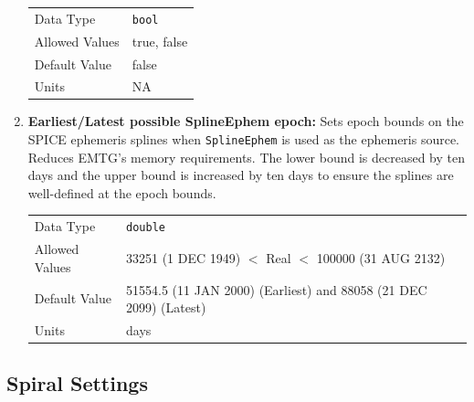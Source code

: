 \begin{enumerate}
            \begin{table}[H]
                \hspace{2cm}
                \begin{tabular}{ll}
                Data Type & \verb|bool| \\
                Allowed Values & true, false \\
                Default Value & false \\
                Units & NA
                \end{tabular}
            \end{table}

        \item \textbf{Earliest/Latest possible SplineEphem epoch:} Sets epoch bounds on the \ac{SPICE} ephemeris splines when \verb|SplineEphem| is used as the ephemeris source. Reduces \ac{EMTG}'s memory requirements. The lower bound is decreased by ten days and the upper bound is increased by ten days to ensure the splines are well-defined at the epoch bounds.
                
            \begin{table}[H]
                \hspace{2cm}
                \begin{tabular}{ll}
                Data Type & \verb|double| \\
                Allowed Values & 33251 (1 DEC 1949) $<$ Real $<$ 100000 (31 AUG 2132)\\
                Default Value & 51554.5 (11 JAN 2000) (Earliest) and 88058 (21 DEC 2099) (Latest)\\
                Units & days
                \end{tabular}
            \end{table}
    
    \end{enumerate}

\subsection{Spiral Settings}

